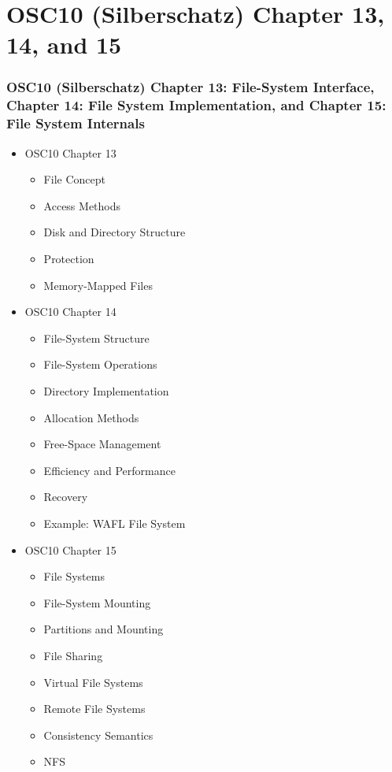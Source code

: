 \documentclass[aspectratio=169, xcolor=table, notheorems, hyperref={pdfpagelabels=false}]{beamer}
\begin{document}
\section{OSC10 (Silberschatz) Chapter 13, 14, and 15}
\begin{frame}
\frametitle{OSC10 (Silberschatz) Chapter 13: File-System Interface, Chapter 14: File System Implementation, and Chapter 15: File System Internals}
\begin{multicols}{3}
  \begin{itemize}
  \item OSC10 Chapter 13
  \begin{itemize}
  \item File Concept
  \item Access Methods
  \item Disk and Directory Structure
  \item Protection
  \item Memory-Mapped Files
  \end{itemize}
  \end{itemize}
  \vfill \null
\columnbreak
  \begin{itemize}
  \item OSC10 Chapter 14
  \begin{itemize}
  \item File-System Structure
  \item File-System Operations
  \item Directory Implementation
  \item Allocation Methods
  \item Free-Space Management
  \item Efficiency and Performance
  \item Recovery
  \item Example: WAFL File System
  \end{itemize}
  \end{itemize}
  \vfill \null
\columnbreak
  \begin{itemize}
  \item OSC10 Chapter 15
  \begin{itemize}
  \item File Systems
  \item File-System Mounting
  \item Partitions and Mounting
  \item File Sharing
  \item Virtual File Systems
  \item Remote File Systems
  \item Consistency Semantics
  \item NFS
  \end{itemize}
  \end{itemize}
  \vfill \null
\end{multicols}
\end{frame}
\end{document}
